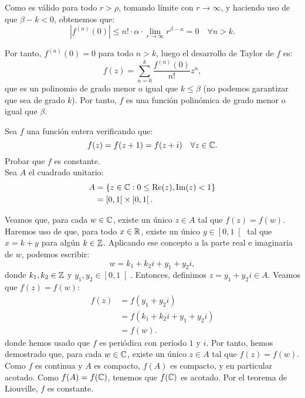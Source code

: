 \begin{ejercicio}
    Como es válido para todo $r>\rho$, tomando límite con $r\to \infty$, y haciendo uso de que $\beta-k<0$, obtenemos que:
    \begin{equation*}
        |f^{(n)}(0)| \leq n!\cdot \alpha \cdot \lim_{r\to \infty} r^{\beta-n}=0 \quad \forall n>k.
    \end{equation*}

    Por tanto, $f^{(n)}(0)=0$ para todo $n>k$, luego el desarrollo de Taylor de $f$ es:
    \begin{equation*}
        f(z)=\sum_{n=0}^{k} \dfrac{f^{(n)}(0)}{n!} z^n,
    \end{equation*}
    que es un polinomio de grado menor o igual que $k\leq \beta$ (no podemos garantizar que sea de grado $k$). Por tanto, $f$ es una función polinómica de grado menor o igual que $\beta$.
\end{ejercicio}

\begin{ejercicio}
    Sea $f$ una función entera verificando que:
    \begin{equation*}
        f(z)=f(z+1)=f(z+i) \quad \forall z\in \mathbb{C}.
    \end{equation*}
    Probar que $f$ es constante.\\

    Sea $A$ el cuadrado unitario:
    \begin{align*}
        A &= \left\{ z\in \mathbb{C} : 0\leq \operatorname{Re}(z),\operatorname{Im}(z)<1 \right\} \\
        &= \left[0,1\right[ \times \left[0,1\right[.
    \end{align*}

    Veamos que, para cada $w\in \mathbb{C}$, existe un único $z\in A$ tal que $f(z)=f(w)$. Haremos uso de que, para todo $x\in \mathbb{R}$, existe un único $y\in \left[0,1\right[$ tal que $x=k+y$ para algún $k\in \mathbb{Z}$. Aplicando ese concepto a la parte real e imaginaria de $w$, podemos escribir:
    \begin{equation*}
        w=k_1 + k_2 i + y_1 + y_2 i,
    \end{equation*}
    donde $k_1,k_2\in \mathbb{Z}$ y $y_1,y_2\in \left[0,1\right[$. Entonces, definimos $z=y_1 + y_2 i\in A$. Veamos que $f(z)=f(w)$:
    \begin{align*}
        f(z) &= f(y_1 + y_2 i) \\
        &= f(k_1 + k_2 i + y_1 + y_2 i) \\
        &= f(w).
    \end{align*}
    donde hemos usado que $f$ es periódica con periodo $1$ y $i$. Por tanto, hemos demostrado que, para cada $w\in \mathbb{C}$, existe un único $z\in A$ tal que $f(z)=f(w)$.\\

    Como $f$ es continua y $A$ es compacto, $f(A)$ es compacto, y en particular acotado. Como $f(A)=f(\mathbb{C})$, tenemos que $f(\mathbb{C})$ es acotado. Por el teorema de Liouville, $f$ es constante.
\end{ejercicio}


